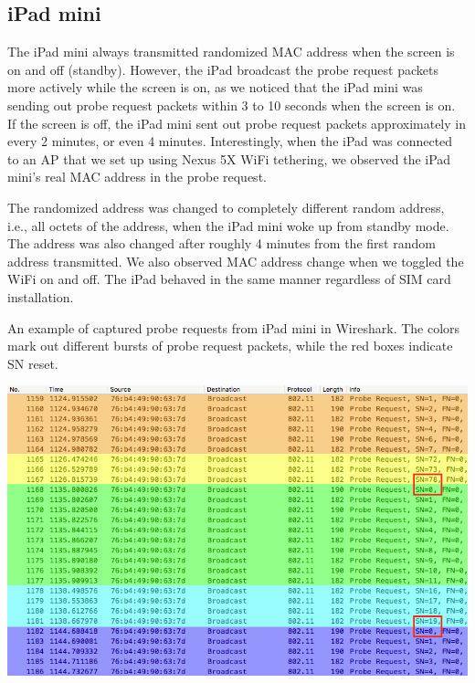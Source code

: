 	\subsection{iPad mini} %
	\label{sub:ipad_mini}
	The iPad mini always transmitted randomized \ac{MAC} address when the screen is on and off (standby). However, the iPad broadcast the probe request packets more actively while the screen is on, as we noticed that the iPad mini was sending out probe request packets within 3 to 10 seconds when the screen is on. If the screen is off, the iPad mini sent out probe request packets approximately in every 2 minutes, or even 4 minutes. Interestingly, when the iPad was connected to an \ac{AP} that we set up using Nexus 5X WiFi tethering, we observed the iPad mini's real \ac{MAC} address in the probe request.

	The randomized address was changed to completely different random address, i.e., all octets of the address, when the iPad mini woke up from standby mode. The address was also changed after roughly 4 minutes from the first random address transmitted. We also observed \ac{MAC} address change when we toggled the WiFi on and off. The iPad behaved in the same manner regardless of \ac{SIM} card installation. 

	\begin{table}[h]
		\caption[Some examples of captured probe requests from iPad mini.]{An example of captured probe requests from iPad mini in Wireshark. The colors mark out different bursts of probe request packets, while the red boxes indicate \ac{SN} reset.}
		\label{fig:ipad-random}
		\centering
		\includegraphics[width=\textwidth]{./img/result/randomization/ipad-mini}
	\end{table}

